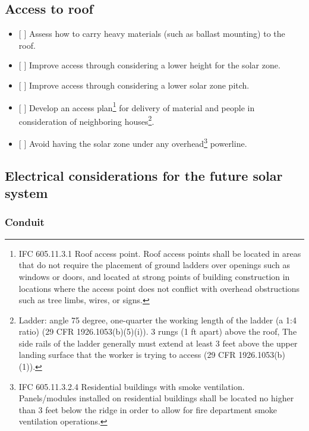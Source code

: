 \documentclass[]{article}
\providecommand{\tightlist}{%
  \setlength{\itemsep}{0pt}\setlength{\parskip}{0pt}}
\let\rmarkdownfootnote\footnote%
\def\footnote{\protect\rmarkdownfootnote}
\begin{document}
\hypertarget{access-to-roof-1}{%
\subsection{Access to roof}\label{access-to-roof-1}}

\begin{itemize}
\tightlist
\item
  {[} {]} Assess how to carry heavy materials (such as ballast mounting)
  to the roof.
\item
  {[} {]} Improve access through considering a lower height for the
  solar zone.
\item
  {[} {]} Improve access through considering a lower solar zone pitch.
\item
  {[} {]} Develop an access plan\footnote{IFC 605.11.3.1 Roof access
    point. Roof access points shall be located in areas that do not
    require the placement of ground ladders over openings such as
    windows or doors, and located at strong points of building
    construction in locations where the access point does not conflict
    with overhead obstructions such as tree limbs, wires, or signs.} for
  delivery of material and people in consideration of neighboring
  houses\footnote{Ladder: angle 75 degree, one-quarter the working
    length of the ladder (a 1:4 ratio) (29 CFR 1926.1053(b)(5)(i)). 3
    rungs (1 ft apart) above the roof, The side rails of the ladder
    generally must extend at least 3 feet above the upper landing
    surface that the worker is trying to access (29 CFR
    1926.1053(b)(1)).}.
\item
  {[} {]} Avoid having the solar zone under any overhead\footnote{IFC
    605.11.3.2.4 Residential buildings with smoke ventilation.
    Panels/modules installed on residential buildings shall be located
    no higher than 3 feet below the ridge in order to allow for fire
    department smoke ventilation operations.} powerline.
\end{itemize}

\hypertarget{electrical-considerations-for-the-future-solar-system}{%
\subsection{Electrical considerations for the future solar
system}\label{electrical-considerations-for-the-future-solar-system}}

\hypertarget{conduit}{%
\subsubsection{Conduit}\label{conduit}}
\end{document}
